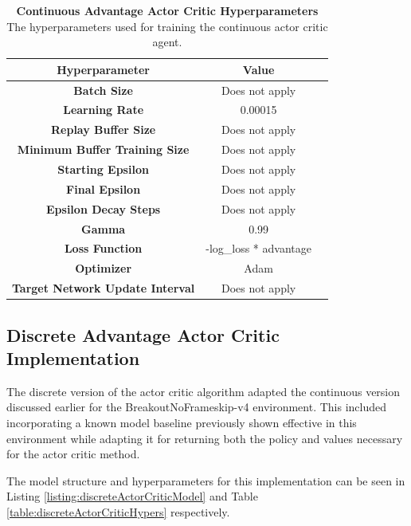 \documentclass[conference]{IEEEtran}
\begin{document}
\begin{table}[htbp]
    \caption{\textbf{Continuous Advantage Actor Critic Hyperparameters}  The hyperparameters used for training the continuous actor critic agent.}
\begin{center}
\begin{tabular}{|c|c|c|}
\hline
\textbf{Hyperparameter} & \textbf{Value} \\
\hline
\textbf{Batch Size} & Does not apply \\
\hline
\textbf{Learning Rate} & 0.00015 \\
\hline
\textbf{Replay Buffer Size} & Does not apply \\
\hline
\textbf{Minimum Buffer Training Size} & Does not apply \\
\hline
\textbf{Starting Epsilon} & Does not apply \\
\hline
\textbf{Final Epsilon} & Does not apply \\
\hline
\textbf{Epsilon Decay Steps} & Does not apply \\
\hline
\textbf{Gamma} & 0.99\\
\hline
\textbf{Loss Function} &  -log\_loss * advantage \\
\hline
\textbf{Optimizer} & Adam \\
\hline
\textbf{Target Network Update Interval} & Does not apply \\
\hline
\end{tabular}
\label{table:continuousActorCriticHypers}
\end{center}
\end{table}


\subsection{Discrete Advantage Actor Critic Implementation}
The discrete version of the actor critic algorithm adapted the continuous version discussed earlier for the BreakoutNoFrameskip-v4 environment.
This included incorporating a known model baseline previously shown effective in this environment while adapting it for returning both the policy and values necessary for the actor critic method.

The model structure and hyperparameters for this implementation can be seen in Listing \ref{listing:discreteActorCriticModel} and Table \ref{table:discreteActorCriticHypers} respectively.
\end{document}
